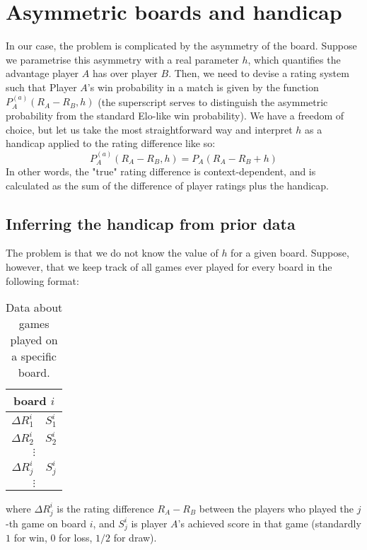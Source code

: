 \documentclass[12pt]{article}
\begin{document}
	\section{Asymmetric boards and handicap}

	In our case, the problem is complicated by the asymmetry of the board. Suppose we parametrise this asymmetry with a real parameter $h$, which quantifies the advantage player $A$ has over player $B$. Then, we need to devise a rating system such that Player $A$'s win probability in a match is given by the function $P^{(a)}_A(R_A - R_B, h)$ (the superscript serves to distinguish the asymmetric probability from the standard Elo-like win probability). We have a freedom of choice, but let us take the most straightforward way and interpret $h$ as a handicap applied to the rating difference like so:
	\begin{equation}\label{asymmetric_expectancy}
	P^{(a)}_A(R_A - R_B, h) = P_A(R_A - R_B + h)
	\end{equation}
	In other words, the "true" rating difference is context-dependent, and is calculated as the sum of the difference of player ratings plus the handicap.
	
	\subsection{Inferring the handicap from prior data}
	
	The problem is that we do not know the value of $h$ for a given board. Suppose, however, that we keep track of all games ever played for every board in the following format:
	\begin{table}[h]
	\begin{center} 
	\begin{tabular}{ c | c }
	\multicolumn{2}{c}{board $i$} \\
	\hline
 	$\Delta R^i_1$ & $S^i_1$ \\ 
 	$\Delta R^i_2$ & $S^i_2$ \\ 
 	\multicolumn{2}{c}{$\vdots$} \\ 
 	$\Delta R^i_j$ & $S^i_j$    \\
 	\multicolumn{2}{c}{$\vdots$}
	\end{tabular}
	\end{center}
	\caption{Data about games played on a specific board.}\label{game_table}
	\end{table}
	
	where $\Delta R^i_j$ is the rating difference $R_A - R_B$ between the players who played the $j$-th game on board $i$, and $S^i_j$ is player $A$'s achieved score in that game (standardly $1$ for win, $0$ for loss, $1/2$ for draw).
	
\end{document}
